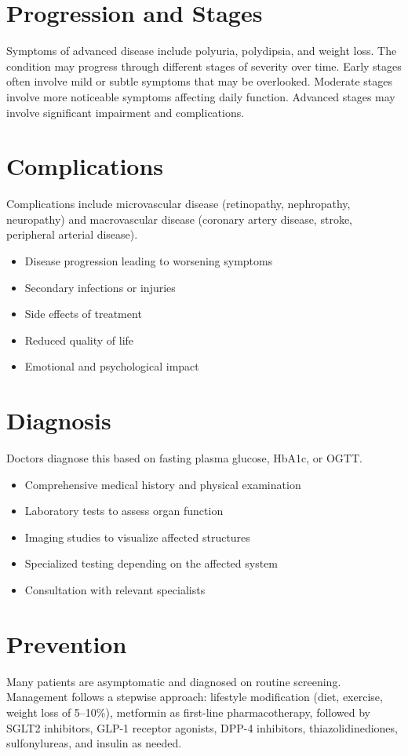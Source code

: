 \section{Progression and Stages}
Symptoms of advanced disease include polyuria, polydipsia, and weight loss. The condition may progress through different stages of severity over time. Early stages often involve mild or subtle symptoms that may be overlooked. Moderate stages involve more noticeable symptoms affecting daily function. Advanced stages may involve significant impairment and complications.
\section{Complications}
Complications include microvascular disease (retinopathy, nephropathy, neuropathy) and macrovascular disease (coronary artery disease, stroke, peripheral arterial disease).

\begin{itemize}[noitemsep]
  \item Disease progression leading to worsening symptoms
  \item Secondary infections or injuries
  \item Side effects of treatment
  \item Reduced quality of life
  \item Emotional and psychological impact
\end{itemize}
\section{Diagnosis}
Doctors diagnose this based on fasting plasma glucose, HbA1c, or OGTT.

\begin{itemize}[noitemsep]
  \item Comprehensive medical history and physical examination
  \item Laboratory tests to assess organ function
  \item Imaging studies to visualize affected structures
  \item Specialized testing depending on the affected system
  \item Consultation with relevant specialists
\end{itemize}
\section{Prevention}
Many patients are asymptomatic and diagnosed on routine screening. Management follows a stepwise approach: lifestyle modification (diet, exercise, weight loss of 5--10\%), metformin as first-line pharmacotherapy, followed by SGLT2 inhibitors, GLP-1 receptor agonists, DPP-4 inhibitors, thiazolidinediones, sulfonylureas, and insulin as needed.

